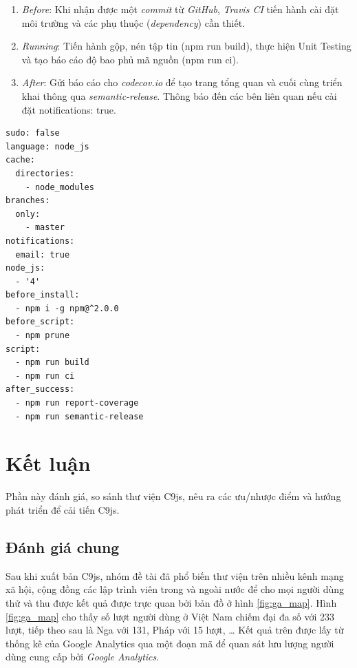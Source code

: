 \documentclass[12pt,a4paper,twoside]{article}
\newcommand*\NewPage{\newpage\null\thispagestyle{empty}\newpage}
\begin{document}
\begin{enumerate}
\item \emph{Before}: Khi nhận được một \textit{commit} từ \textit{GitHub}, \textit{Travis CI} tiến hành cài đặt môi trường và các phụ thuộc (\textit{dependency}) cần thiết.
\item \emph{Running}: Tiến hành gộp, nén tập tin (\textsf{npm run build}), thực hiện Unit Testing và tạo báo cáo độ bao phủ mã nguồn (\textsf{npm run ci}).
\item \emph{After}: Gửi báo cáo cho \textit{codecov.io} để tạo trang tổng quan và cuối cùng triển khai thông qua \textit{semantic-release}. Thông báo đến các bên liên quan nếu cài đặt \textsf{notifications: true}.
\end{enumerate}

\begin{lstlisting}[caption=Cấu hình Travis CI kiểm soát cả 3 giai đoạn,label={code:travisci}]
sudo: false
language: node_js
cache:
  directories:
    - node_modules
branches:
  only:
    - master
notifications:
  email: true
node_js:
  - '4'
before_install:
  - npm i -g npm@^2.0.0
before_script:
  - npm prune
script:
  - npm run build
  - npm run ci
after_success:
  - npm run report-coverage
  - npm run semantic-release
\end{lstlisting}

\clearpage
\NewPage
\section{Kết luận}
Phần này đánh giá, so sánh thư viện C9js, nêu ra các ưu/nhược điểm và hướng phát triển để cải tiến C9js.
\subsection{Đánh giá chung}\label{sec:eval}
Sau khi xuất bản C9js, nhóm đề tài đã phổ biến thư viện trên nhiều kênh mạng xã hội, cộng đồng các lập trình viên trong và ngoài nước để cho mọi người dùng thử và thu được kết quả được trực quan bởi bản đồ ở hình \ref{fig:ga_map}. Hình \ref{fig:ga_map} cho thấy số lượt người dùng ở Việt Nam chiếm đại đa số với 233 lượt, tiếp theo sau là Nga với 131, Pháp với 15 lượt, … Kết quả trên được lấy từ thống kê của Google Analytics qua một đoạn mã để quan sát lưu lượng người dùng cung cấp bởi \textit{Google Analytics}\cite{ga_c9js}.
\end{document}
